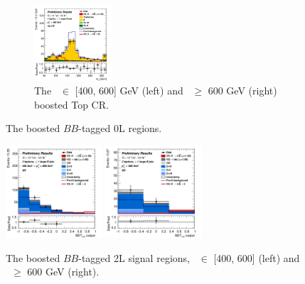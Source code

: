 \begin{figure}[h!]
\begin{subfigure}[b]{\textwidth}
        \includegraphics[width=0.32\textwidth]{Images/VH/Own_fit/postfit_VHbb/Region_distmBB_BMin600_incFat1_Fat1_DSRtopaddbjetcr_J0_TTypebb_incJet1_T2_L1_Y6051_GlobalFit_conditionnal_mu1.png}
        \caption{The \ptv\ $\in$ [400, 600] GeV (left) and \ptv\ $\geq$ 600 GeV (right) boosted Top CR.}
        \label{fig:plots_VHbbBoost_1L_topCR}
    \end{subfigure}
    \caption{The boosted $BB$-tagged 0L regions.}
    \label{fig:plots_VHbbBoost_1L}
\end{figure} 

\vspace*{\fill}

\begin{figure}[h!]
    \centering
    \includegraphics[width=0.32\textwidth]{Images/VH/Own_fit/postfit_VHbb/Region_distmva_BMax600_BMin400_incFat1_Fat1_DSR_J0_TTypebb_incJet1_T2_L2_Y6051_GlobalFit_conditionnal_mu1.png}
    \includegraphics[width=0.32\textwidth]{Images/VH/Own_fit/postfit_VHbb/Region_distmva_BMin600_incFat1_Fat1_DSR_J0_TTypebb_incJet1_T2_L2_Y6051_GlobalFit_conditionnal_mu1.png}
    \caption{The boosted $BB$-tagged 2L signal regions, \ptv\ $\in$ [400, 600] (left) and \ptv\ $\geq$ 600 GeV (right).}
    \label{fig:plots_VHbbBoost_2L_SR}
\end{figure} 
